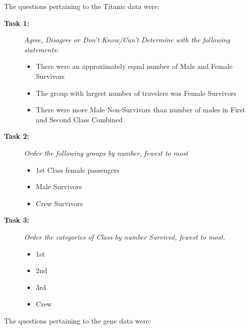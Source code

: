 \noindent The questions pertaining to the Titanic data were: 
\begin{description}
\item[\bf Task 1: ]\emph{ Agree, Disagree or Don't Know/Can't Determine with the following statements:}
\begin{itemize}
\item There were an approximately equal number of Male and Female Survivors
\item The group with largest number of travelers was Female Survivors
\item There were more Male Non-Survivors than number of males in First and Second Class Combined
\end{itemize}

\item[\bf Task 2: ]\emph{ Order the following groups by number, fewest to most}
\begin{itemize}
\item 1st Class female passengers
\item Male Survivors
\item Crew Survivors
\end{itemize}

\item[\bf Task 3: ]\emph{ Order the categories of Class by number Survived, fewest to most.} 
\begin{itemize}
\item 1st
\item 2nd 
\item 3rd
\item Crew
\end{itemize}
\end{description}


\noindent The questions pertaining to the gene data were: 


